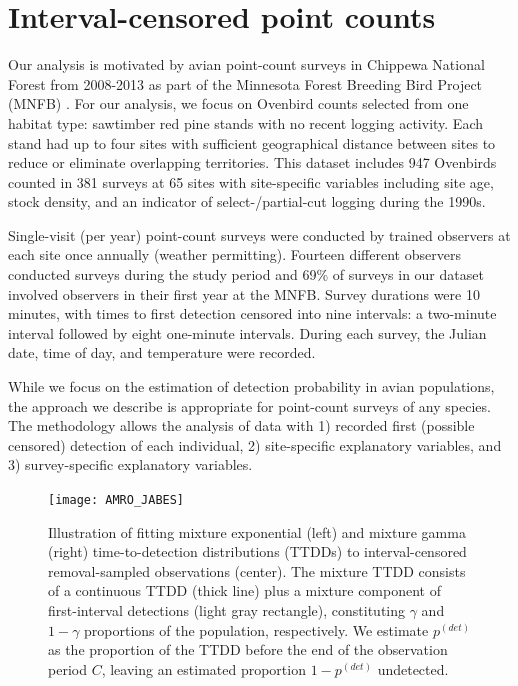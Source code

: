 \documentclass[12pt]{article}
\newcommand{\pdet}{p^{(det)}}
\begin{document}
\section{Interval-censored point counts}\label{sec:data}

Our analysis is motivated by avian point-count surveys in Chippewa National Forest from 2008-2013 as part of the Minnesota Forest Breeding Bird Project (MNFB) \citep{Hanowski1995}.  
For our analysis, we focus on Ovenbird counts selected from one habitat type: sawtimber red pine stands with no recent logging activity.  
Each stand had up to four sites with sufficient geographical distance between sites to reduce or eliminate overlapping territories.
This dataset includes 947 Ovenbirds counted in 381 surveys at 65 sites with site-specific variables including site age,  stock density, and an indicator of select-/partial-cut logging during the 1990s.

Single-visit (per year) point-count surveys were conducted by trained observers at each site once annually (weather permitting).  
Fourteen different observers conducted surveys during the study period and 69\% of surveys in our dataset involved observers in their first year at the MNFB.  
Survey durations were 10 minutes, with times to first detection censored into nine intervals: a two-minute interval followed by eight one-minute intervals.  
During each survey, the Julian date, time of day, and temperature were recorded. 

While we focus on the estimation of detection probability in avian populations, the approach we describe is appropriate for point-count surveys of any species.
The methodology allows the analysis of data with 1) recorded first (possible censored) detection of each individual, 2) site-specific explanatory variables, and 3) survey-specific explanatory variables.  

\begin{figure}\centering
\texttt{[image: AMRO\_JABES]} %
\caption{\label{fig:schematic} 
Illustration of fitting mixture exponential (left) and mixture gamma (right) time-to-detection distributions (TTDDs) to interval-censored removal-sampled observations (center).
The mixture TTDD consists of a continuous TTDD (thick line) plus a mixture component of first-interval detections (light gray rectangle), constituting $\gamma$ and $1-\gamma$ proportions of the population, respectively.
We estimate $\pdet$ as the proportion of the TTDD before the end of the observation period $C$, leaving an estimated proportion $1-\pdet$ undetected.
}
\end{figure}
\end{document}
